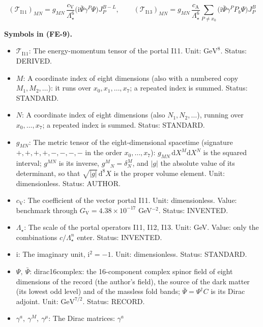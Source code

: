 \documentclass[
  10pt,
]{article}
\providecommand{\tightlist}{%
  \setlength{\itemsep}{0pt}\setlength{\parskip}{0pt}}
\begin{document}
\[
(\mathcal{T}_{\mathrm{I11}})_{MN} =
 g_{MN}\,\frac{c_{\mathrm{V}}}{\Lambda_\star^6}\big(\mathrm{i}\bar\Psi\gamma^P\Psi\big)J^{B-L}_P,
\qquad (\mathcal{T}_{\mathrm{I13}})_{MN} = g_{MN}\,\frac{c_{\mathrm{A}}}{\Lambda_\star^6}
 \sum_{P\ne x_0}\big(\mathrm{i}\bar\Psi\gamma^PP_b\Psi\big)J^{B}_P \tag{FE-9}
\]

\textbf{Symbols in (FE-9).}

\begin{itemize}
\tightlist
\item
  \(\mathcal{T}_{\mathrm{I11}}\): The energy-momentum tensor of the
  portal I11. Unit: \(\mathrm{GeV}^{8}\). Status: DERIVED.
\item
  \(M\): A coordinate index of eight dimensions (also with a numbered
  copy \(M_1, M_2, \dots\)): it runs over \(x_0, x_1, \dots, x_7\); a
  repeated index is summed. Status: STANDARD.
\item
  \(N\): A coordinate index of eight dimensions (also
  \(N_1, N_2, \dots\)), running over \(x_0, \dots, x_7\); a repeated
  index is summed. Status: STANDARD.
\item
  \(g_{MN}\): The metric tensor of the eight-dimensional spacetime
  (signature \(+,+,+,+,-,-,-,-\) in the order \(x_0, \dots, x_7\)):
  \(g_{MN}\,\mathrm{d}X^M\mathrm{d}X^N\) is the squared interval;
  \(g^{MN}\) is its inverse, \(g^M{}_N = \delta^M_N\), and
  \(\lvert g\rvert\) the absolute value of its determinant, so that
  \(\sqrt{\lvert g\rvert}\,\mathrm{d}^8X\) is the proper volume element.
  Unit: dimensionless. Status: AUTHOR.
\item
  \(c_{\mathrm{V}}\): The coefficient of the vector portal I11. Unit:
  dimensionless. Value: benchmark through
  \(G_{\mathrm{V}} = 4.38\times10^{-17}\) GeV\(^{-2}\). Status:
  INVENTED.
\item
  \(\Lambda_\star\): The scale of the portal operators I11, I12, I13.
  Unit: GeV. Value: only the combinations \(c/\Lambda_\star^n\) enter.
  Status: INVENTED.
\item
  \(\mathrm{i}\): The imaginary unit, \(\mathrm{i}^2 = -1\). Unit:
  dimensionless. Status: STANDARD.
\item
  \(\Psi,\ \bar\Psi\): dirac16complex: the 16-component complex spinor
  field of eight dimensions of the record (the author's field), the
  source of the dark matter (its lowest odd level) and of the massless
  fold bands; \(\bar\Psi = \Psi^\dagger C\) is its Dirac adjoint. Unit:
  \(\mathrm{GeV}^{7/2}\). Status: RECORD.
\item
  \(\gamma^a,\ \gamma^M,\ \gamma^\mu\): The Dirac matrices: \(\gamma^a\)

\end{itemize}
\end{document}
